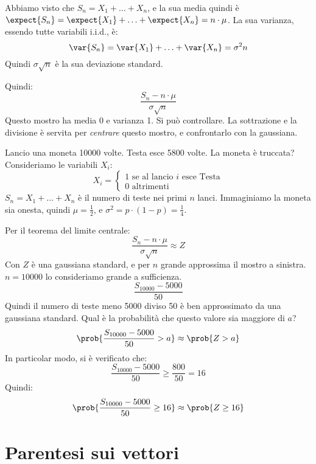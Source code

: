 Abbiamo visto che $S_n = X_1 + \ldots + X_n$, e la sua media quindi \`e $\expect{S_n} = \expect{X_1} + \ldots + \expect{X_n} = n \cdot \mu$. La sua varianza, essendo tutte variabili i.i.d., \`e:
\[
\var{S_n} = \var{X_1} + \ldots + \var{X_n} = \sigma^2 n
\]
Quindi $\sigma \sqrt{n}$ \`e la sua deviazione standard.

Quindi:
\[
\frac{S_n - n \cdot \mu}{\sigma \sqrt{n}}
\]
Questo mostro ha media 0 e varianza 1. Si pu\`o controllare. La sottrazione e la divisione \`e servita per \emph{centrare} questo mostro, e confrontarlo con la gaussiana.

\begin{exmp}
Lancio una moneta 10000 volte. Testa esce 5800 volte. La moneta \`e truccata? Consideriamo le variabili $X_i$:
\[
X_i =
\begin{cases}
1 \text{ se al lancio $i$ esce Testa} \\
0 \text{ altrimenti}
\end{cases}
\]
$S_n = X_1 + \ldots + X_n$ \`e il numero di teste nei primi $n$ lanci. Immaginiamo la moneta sia onesta, quindi $\mu = \frac{1}{2}$, e $\sigma^2 = p \cdot (1 - p) = \frac{1}{4}$.

Per il teorema del limite centrale:
\[
\frac{S_n - n \cdot \mu}{\sigma \sqrt{n}} \approx Z
\]
Con $Z$ \`e una gaussiana standard, e per $n$ grande approssima il mostro a sinistra. $n = 10000$ lo consideriamo grande a sufficienza.
\[
\frac{S_{10000} - 5000}{50}
\]
Quindi il numero di teste meno 5000 diviso 50 \`e ben approssimato da una gaussiana standard. Qual \`e la probabilit\`a che questo valore sia maggiore di $a$?
\[
\prob{ \frac{S_{10000} - 5000}{50} > a} \approx \prob{Z > a}
\]
In particolar modo, si \`e verificato che:
\[
\frac{S_{10000} - 5000}{50} \ge \frac{800}{50} = 16
\]
Quindi:
\[
\prob{\frac{S_{10000} - 5000}{50} \ge 16} \approx \prob{Z \ge 16}
\]
\end{exmp}




\section{Parentesi sui vettori}

